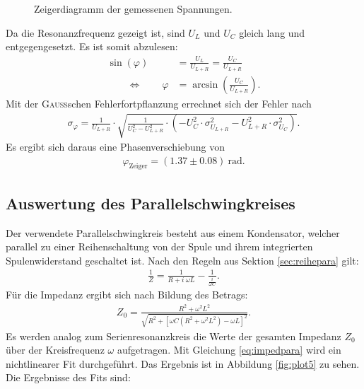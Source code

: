 \documentclass[12pt,a4paper,titlepage,headinclude]{scrartcl}
\numberwithin{equation}{subsection}
\newcommand{\aeqiv}{\ensuremath{\qquad \Longleftrightarrow \qquad}} %
\newcommand{\mrm}[1]{\mathrm{#1}}
\newcommand{\person}[1]{\textsc{#1}}
\begin{document}
\begin{figure}[h!]
	\centering
	\resizebox{4cm}{!}{}
	\caption{Zeigerdiagramm der gemessenen Spannungen.}
	\label{fig:zeiger2}
\end{figure}
Da die Resonanzfrequenz gezeigt ist, sind $U_L$ und $U_C$ gleich lang und entgegengesetzt. Es ist somit abzulesen:
\begin{align}
	\sin(\varphi)&=\frac{U_L}{U_{L+R}}=\frac{U_C}{U_{L+R}}\\
	\aeqiv\varphi&=\arcsin\left(\frac{U_C}{U_{L+R}}\right).
\end{align}
Mit der \person{Gauss}schen Fehlerfortpflanzung errechnet sich der Fehler nach
\begin{align}
	\sigma_{\varphi}=\frac{1}{U_{L+R}} \cdot \sqrt{\frac{1}{U_{C}^{2} - U_{L+R}^{2}} \cdot \left(- U_{C}^{2} \cdot \sigma_{U_{L+R}}^{2} - U_{L+R}^{2} \cdot \sigma_{U_{C}}^{2}\right)}.
	\label{eq:sigmaphasezeiger}
\end{align}
Es ergibt sich daraus eine Phasenverschiebung von
\begin{align}
	\varphi_{\text{Zeiger}}=(1.37\pm0.08)~\mrm{rad}.
	\label{eq:phasezeiger}
\end{align}
\subsection{Auswertung des Parallelschwingkreises}
\label{sec:parakreis}
Der verwendete Parallelschwingkreis besteht aus einem Kondensator, welcher parallel zu einer Reihenschaltung von der Spule und ihrem integrierten Spulenwiderstand geschaltet ist.
Nach den Regeln aus Sektion \ref{sec:reihepara} gilt:
\begin{align}
	\frac{1}{Z}=\frac{1}{R+i~\omega L}-\frac{1}{\frac{i}{\omega C}}.
	\label{eq:zpara}
\end{align}
Für die Impedanz ergibt sich nach Bildung des Betrags:
\begin{align}
	Z_0=\frac{R^2+\omega^2 L^2}{\sqrt{R^2+\left[ \omega C(R^2+\omega^2L^2)-\omega L \right]^2}}.
	\label{eq:impedpara}
\end{align}
Es werden analog zum Serienresonanzkreis die Werte der gesamten Impedanz $Z_0$ über der Kreisfrequenz $\omega$ aufgetragen. Mit Gleichung \eqref{eq:impedpara} wird ein nichtlinearer Fit durchgeführt. Das Ergebnis ist in Abbildung \ref{fig:plot5} zu sehen.
Die Ergebnisse des Fits sind:
\end{document}
